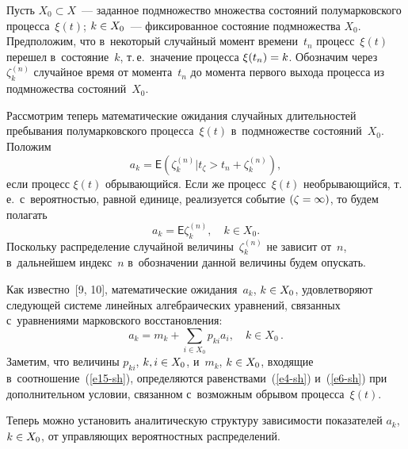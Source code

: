 \begin{multicols}{2}
Пусть $X_{0} \subset X$~--- заданное подмножество множества со\-сто\-яний 
полумарковского процесса~$\xi (t)$; $k \hm\in X_0$~--- фиксированное со\-сто\-яние 
подмножества $X_0$. Предположим, что в~некоторый случайный момент времени~$t_n$ 
процесс~$\xi(t)$ перешел в~со\-сто\-яние~$k$, т.\,е.\ значение процесса $\xi(t_n)\hm=k$. 
Обозначим через~$\zeta_k^{(n)}$ случайное время от момента~$t_n$ до момента 
первого выхода процесса из подмножества состояний~$X_0$.

Рассмотрим теперь математические ожидания случайных длительностей пребывания 
полумарковского процесса~$\xi(t)$ в~подмножестве состояний~$X_0$. Положим
\begin{equation*}
    a_k=\mathsf{E}\left(\zeta_k^{(n)}|t_\zeta>t_n+\zeta_k^{(n)}\right),
\end{equation*}
если процесс $\xi(t)$ обрывающийся. Если же процесс~$\xi(t)$ необрывающийся, 
т.\,е.\ с~вероятностью, равной единице, реализуется событие $(\zeta\hm=\infty)$, то 
будем полагать
\begin{equation*}
    a_k=\mathsf{E}\zeta_k^{(n)},\quad k \in X_0.
\end{equation*}
Поскольку распределение случайной величины~$\zeta_k^{(n)}$ не зависит от~$n$, 
в~дальнейшем индекс~$n$ в~обозначении данной величины будем опускать.

Как известно~[9, 10], математические ожидания~$a_k$, $k\hm\in X_0$, удовле\-тво\-ря\-ют 
сле\-ду\-ющей сис\-те\-ме линейных ал\-геб\-ра\-и\-че\-ских уравнений, связанных с~урав\-не\-ни\-ями 
марковского восстановления:
\begin{equation}
a_k=m_k+\sum\limits_{i \in X_0}p_{ki}a_i, \quad k\in X_0\,.
\label{e15-sh}
\end{equation}
Заметим, что величины $p_{ki}$, $k,i\hm\in X_0$, и~$m_k$, $k\hm\in X_0$, входящие 
в~соотношение~(\ref{e15-sh}), определяются равенствами~(\ref{e4-sh}) и~(\ref{e6-sh}) 
при дополнительном условии,  связанном с~возможным обрывом процесса~$\xi(t)$.

Теперь можно установить аналитическую структуру зависимости показателей 
$a_k$, $k\hm\in X_0$, от управ\-ля\-ющих вероятностных распределений.

\smallskip


\end{multicols}
